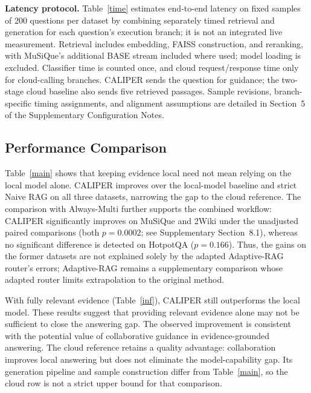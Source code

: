 \documentclass[a4paper,fleqn]{cas-dc}
\begin{document}
\textbf{Latency protocol.} Table~\ref{time} estimates end-to-end latency on fixed samples of 200 questions per dataset by combining separately timed retrieval and generation for each question's execution branch; it is not an integrated live measurement. Retrieval includes embedding, FAISS construction, and reranking, with MuSiQue's additional BASE stream included where used; model loading is excluded. Classifier time is counted once, and cloud request/response time only for cloud-calling branches. CALIPER sends the question for guidance; the two-stage cloud baseline also sends five retrieved passages. Sample revisions, branch-specific timing assignments, and alignment assumptions are detailed in Section~5 of the Supplementary Configuration Notes.

\subsection{Performance Comparison}
Table~\ref{main} shows that keeping evidence local need not mean relying on the local model alone. CALIPER improves over the local-model baseline and strict Naive RAG on all three datasets, narrowing the gap to the cloud reference. The comparison with Always-Multi further supports the combined workflow: CALIPER significantly improves on MuSiQue and 2Wiki under the unadjusted paired comparisons (both $p=0.0002$; see Supplementary Section~8.1), whereas no significant difference is detected on HotpotQA ($p=0.166$). Thus, the gains on the former datasets are not explained solely by the adapted Adaptive-RAG router's errors; Adaptive-RAG remains a supplementary comparison whose adapted router limits extrapolation to the original method.

With fully relevant evidence (Table~\ref{inf}), CALIPER still outperforms the local model. These results suggest that providing relevant evidence alone may not be sufficient to close the answering gap. The observed improvement is consistent with the potential value of collaborative guidance in evidence-grounded answering. The cloud reference retains a quality advantage: collaboration improves local answering but does not eliminate the model-capability gap. Its generation pipeline and sample construction differ from Table~\ref{main}, so the cloud row is not a strict upper bound for that comparison.

\begin{table}[pos=!htb]
\caption{Answer F1 with fully relevant evidence on 7,405/2,410/12,576 questions (HotpotQA/MuSiQue/2Wiki). All methods use the same questions.}
\label{inf}
\centering
\small
{}
\end{table}
\end{document}
